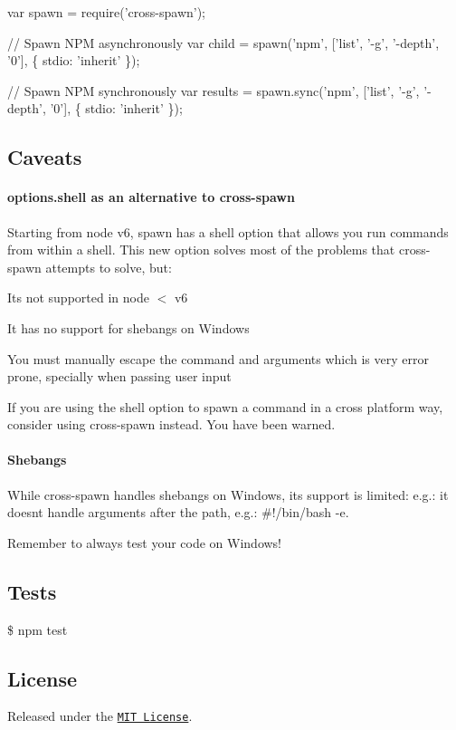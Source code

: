 \begin{DoxyCode}
var spawn = require('cross-spawn');

// Spawn NPM asynchronously
var child = spawn('npm', ['list', '-g', '-depth', '0'], \{ stdio: 'inherit' \});

// Spawn NPM synchronously
var results = spawn.sync('npm', ['list', '-g', '-depth', '0'], \{ stdio: 'inherit' \});
\end{DoxyCode}


\subsection*{Caveats}

\paragraph*{{\ttfamily options.\+shell} as an alternative to {\ttfamily cross-\/spawn}}

Starting from node v6, {\ttfamily spawn} has a {\ttfamily shell} option that allows you run commands from within a shell. This new option solves most of the problems that {\ttfamily cross-\/spawn} attempts to solve, but\+:


\begin{DoxyItemize}
\item It\textquotesingle{}s not supported in node $<$ v6
\item It has no support for shebangs on Windows
\item You must manually escape the command and arguments which is very error prone, specially when passing user input
\end{DoxyItemize}

If you are using the {\ttfamily shell} option to spawn a command in a cross platform way, consider using {\ttfamily cross-\/spawn} instead. You have been warned.

\paragraph*{Shebangs}

While {\ttfamily cross-\/spawn} handles shebangs on Windows, its support is limited\+: e.\+g.\+: it doesn\textquotesingle{}t handle arguments after the path, e.\+g.\+: {\ttfamily \#!/bin/bash -\/e}.

Remember to always test your code on Windows!

\subsection*{Tests}

{\ttfamily \$ npm test}

\subsection*{License}

Released under the \href{http://www.opensource.org/licenses/mit-license.php}{\tt M\+IT License}. 